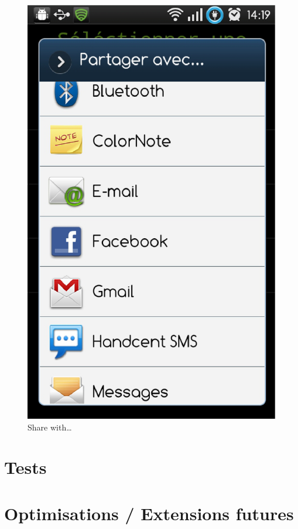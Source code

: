 \begin{figure}[H]
\centering
  \label{partage}
   \includegraphics[scale=0.4]{Images/partage.eps}
  \caption{Share with\ldots}
\end{figure} 




\section{Tests}

\section{Optimisations / Extensions futures}
